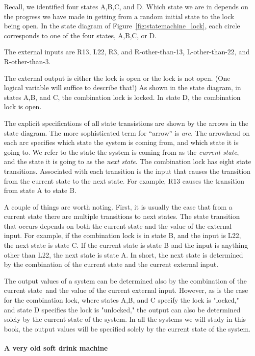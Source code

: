 \documentclass{patt}
\begin{document}
Recall, we identified four states A,B,C, and D.  Which state we are in depends
on the progress we have made in getting from a random initial state to the
lock being open.  In the state diagram of Figure~\ref{fig:statemachine_lock}, 
each circle corresponds to one of the four states, A,B,C, or D.

The external inputs are R13, L22, R3, and R-other-than-13, L-other-than-22,
and R-other-than-3. 

The external output is either the lock is open or the lock is not open.  (One
logical variable will suffice to describe that!)  As shown in the state 
diagram, in states A,B, and C, the combination lock is locked.  In state D, 
the combination lock is open.

The explicit specifications of all state transistions are shown by the arrows
in the state diagram.  The more sophisticated term for
``arrow'' is {\em arc}.  The arrowhead on each arc specifies which state
the system is coming from, and which state it is going to.  We refer to the
state the system is coming from as the {\em current state}, and the state it
is going to as the {\em next state}.  The combination lock has eight state 
transitions.  Associated with each transition is the input that causes the 
transition from the current state to the next state.  
For example, R13 causes the transition from state A to state B.

A couple of things are worth noting.  First, it is usually the case that from 
a current state there are multiple transitions to next states.  The state 
transition that occurs depends on both the current state and the value of the 
external input.  For example, if the combination lock is in state B, and the 
input is L22, the next state is state C.  If the current state is state B and
the input is anything other than L22, the next state is state A.  In short, 
the next state is determined by the combination of the current state and the 
current external input.

The output values of a system can be determined also by the combination of
the current state~and the value of the current external input.  However, as
is the case for the combination lock, where states A,B, and C specify the lock
is "locked," and state D specifies the lock is "unlocked," the output can also 
be determined solely by the current state of the system.  In all the systems we 
will study in this book, the output values will be specified solely by the 
current state of the system.  

\paragraph{A very old soft drink machine}
\end{document}
